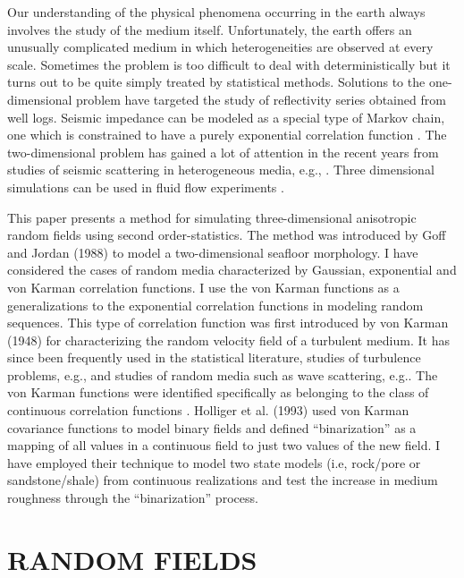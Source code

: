 Our understanding of the physical phenomena occurring in the earth always 
involves the study of the medium itself. Unfortunately, the earth offers
an unusually complicated medium in which heterogeneities are observed at every
scale. Sometimes the problem is too difficult to deal with deterministically
but it turns out to be quite simply treated by statistical methods. 
Solutions to the one-dimensional problem have targeted the study of reflectivity
series obtained from well logs. 
Seismic impedance can be modeled as a special type of Markov
chain, one which is constrained to have a purely exponential correlation
function \cite{Godfrey}. 
The two-dimensional problem has gained a lot of attention in the 
recent years from studies of seismic scattering in heterogeneous media, e.g.,  
\cite{Wu,Frankel,Goff,Holliger1,Holliger2}.  
Three dimensional simulations can 
be used in fluid flow experiments \cite{Popovici.sep.60.295}.\\ 
\par
This paper presents
a method for simulating three-dimensional anisotropic random fields 
using second order-statistics. The method was introduced by Goff and Jordan
(1988) to model a two-dimensional seafloor morphology. 
I have considered the cases of random media 
characterized by Gaussian, exponential and von Karman correlation functions.
I use the von Karman functions as a generalizations to the exponential 
correlation functions in modeling random sequences. 
This type of correlation function was first introduced by von Karman (1948)
for characterizing the random velocity field of a turbulent medium. It has 
since been frequently used in the statistical literature, studies
of turbulence problems, e.g.\cite{Tatarski},
and studies of random media such as wave scattering, e.g.\cite{Chernov}.
The von Karman functions were identified specifically as belonging to the
class of continuous correlation functions \cite{Matern}.
Holliger et al. (1993) used von Karman covariance functions to model binary
fields and defined ``binarization'' as a mapping of all values in
a continuous field to just two values of the new field.
I have employed their technique to model
two state models (i.e, rock/pore or sandstone/shale) from 
continuous realizations and test the
increase in medium roughness through the ``binarization'' process.
  
\section{RANDOM FIELDS}

